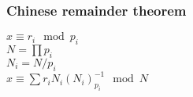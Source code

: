 \subsubsection{Chinese remainder theorem}
\begin{body}
  $x \equiv r_i \mod p_i $\\
  $N = \prod p_i$\\
  $N_i = N / p_i$\\
  $x \equiv \sum r_i N_i (N_i)^{-1}_{p_i} \mod N$
\end{body}
